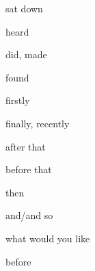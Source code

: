 \begin{flashcard}{\LARGE sat down}
\LARGE {}
\end{flashcard}
\begin{flashcard}{\LARGE heard}
\LARGE {}
\end{flashcard}
\begin{flashcard}{\LARGE did, made}
\LARGE {}
\end{flashcard}
\begin{flashcard}{\LARGE found}
\LARGE {}
\end{flashcard}
\begin{flashcard}{\LARGE firstly}
\LARGE {}
\end{flashcard}
\begin{flashcard}{\LARGE finally, recently}
\LARGE {}
\end{flashcard}
\begin{flashcard}{\LARGE after that}
\LARGE {}
\end{flashcard}
\begin{flashcard}{\LARGE before that}
\LARGE {}
\end{flashcard}
\begin{flashcard}{\LARGE then}
\LARGE {}
\end{flashcard}
\begin{flashcard}{\LARGE and/and so}
\LARGE {}
\end{flashcard}
\begin{flashcard}{\LARGE what would you like}
\LARGE {}
\end{flashcard}
\begin{flashcard}{\LARGE before}
\LARGE {}
\end{flashcard}

